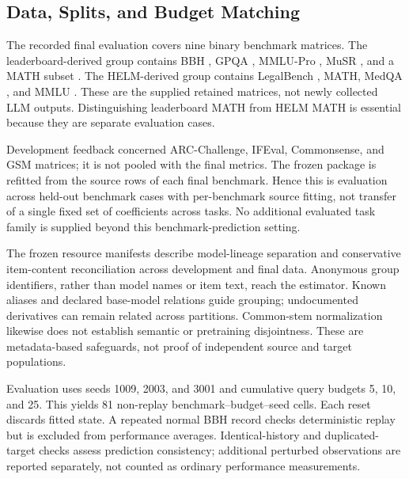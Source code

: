 \documentclass{article}
\begin{document}
\subsection{Data, Splits, and Budget Matching}
The recorded final evaluation covers nine binary benchmark matrices. The leaderboard-derived group contains BBH \citep{Suzgun2022}, GPQA \citep{Rein2023}, MMLU-Pro \citep{Wang2024}, MuSR \citep{Sprague2023}, and a MATH subset \citep{Hendrycks2021}. The HELM-derived group \citep{Liang2023} contains LegalBench \citep{Guha2023}, MATH, MedQA \citep{Jin2020}, and MMLU \citep{Hendrycks2020}. These are the supplied retained matrices, not newly collected LLM outputs. Distinguishing leaderboard MATH from HELM MATH is essential because they are separate evaluation cases.

Development feedback concerned ARC-Challenge, IFEval, Commonsense, and GSM matrices; it is not pooled with the final metrics. The frozen package is refitted from the source rows of each final benchmark. Hence this is evaluation across held-out benchmark cases with per-benchmark source fitting, not transfer of a single fixed set of coefficients across tasks. No additional evaluated task family is supplied beyond this benchmark-prediction setting.

The frozen resource manifests describe model-lineage separation and conservative item-content reconciliation across development and final data. Anonymous group identifiers, rather than model names or item text, reach the estimator. Known aliases and declared base-model relations guide grouping; undocumented derivatives can remain related across partitions. Common-stem normalization likewise does not establish semantic or pretraining disjointness. These are metadata-based safeguards, not proof of independent source and target populations.

Evaluation uses seeds 1009, 2003, and 3001 and cumulative query budgets 5, 10, and 25. This yields 81 non-replay benchmark--budget--seed cells. Each reset discards fitted state. A repeated normal BBH record checks deterministic replay but is excluded from performance averages. Identical-history and duplicated-target checks assess prediction consistency; additional perturbed observations are reported separately, not counted as ordinary performance measurements.
\end{document}
